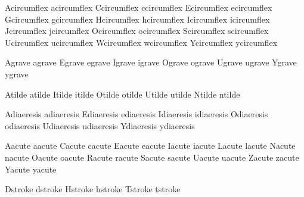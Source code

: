 

 Acircumflex acircumflex
 Ccircumflex ccircumflex
 Ecircumflex ecircumflex
 Gcircumflex gcircumflex
 Hcircumflex hcircumflex
 Icircumflex icircumflex
 Jcircumflex jcircumflex
 Ocircumflex ocircumflex
 Scircumflex scircumflex
 Ucircumflex ucircumflex
 Wcircumflex wcircumflex
 Ycircumflex ycircumflex

 Agrave agrave
 Egrave egrave
 Igrave igrave
 Ograve ograve
 Ugrave ugrave
 Ygrave ygrave

 Atilde atilde
 Itilde itilde
 Otilde otilde
 Utilde utilde
 Ntilde ntilde

 Adiaeresis adiaeresis
 Ediaeresis ediaeresis
 Idiaeresis idiaeresis
 Odiaeresis odiaeresis
 Udiaeresis udiaeresis
 Ydiaeresis ydiaeresis

 Aacute aacute
 Cacute cacute
 Eacute eacute
 Iacute iacute
 Lacute lacute
 Nacute nacute
 Oacute oacute
 Racute racute
 Sacute sacute
 Uacute uacute
 Zacute zacute
 Yacute yacute

 Dstroke dstroke
 Hstroke hstroke
 Tstroke tstroke

